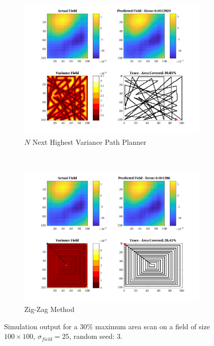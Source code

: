 \begin{figure}[htb!]
\begin{subfigure}[t]{0.5\textwidth}
    \end{subfigure}%
    \\
    \begin{subfigure}[t]{0.5\textwidth}
        \centering
        \includegraphics[width=\linewidth]{figures/hbresults/nnhv_30p_100x100_sf_25_seed_3.png}
        \captionsetup{skip=0.10\baselineskip,size=footnotesize}
        \caption{$N$ Next Highest Variance Path Planner}
    \end{subfigure}%
    ~
    \begin{subfigure}[t]{0.5\textwidth}
        \centering
        \includegraphics[width=\linewidth]{figures/hbresults/zz_30p_100x100_sf_25_seed_3.png}
        \captionsetup{skip=0.10\baselineskip,size=footnotesize}
        \caption{Zig-Zag Method}
    \end{subfigure}%
    \captionsetup{skip=0.20\baselineskip}
    \caption{Simulation output for a $30\%$ maximum area scan on a field of size $100 \times 100$, $\sigma_{field} = 25$, random seed: 3.}
    \label{fig:sim_sigma25_p30_s3}
\end{figure}

